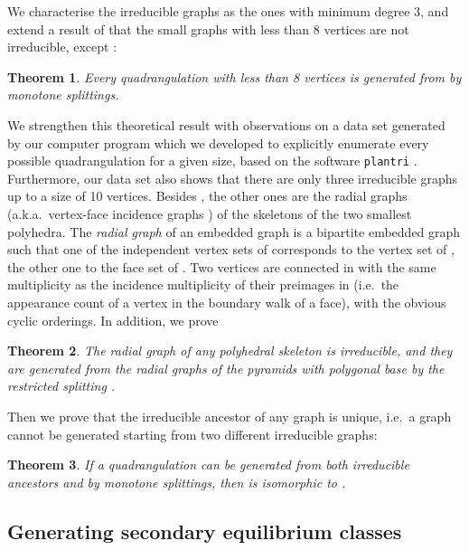 \documentclass[]{article}
\newtheorem{theo}{Theorem}\newtheorem{prop}{Proposition}\newtheorem*{prop*}{Proposition}\newtheorem{coro}{Corollary}\newtheorem{lemm}{Lemma}\theoremstyle{definition}
\newcommand{\plantri}{{\tt plantri}\xspace}
\begin{document}
We characterise the irreducible graphs as the ones with minimum degree 3, and extend a result of \citet{Batagelj1989} that the small graphs with less than 8 vertices are not irreducible, except :

\begin{theo}
  \label{theo:gomboc}
  Every quadrangulation with less than 8 vertices is generated from  by monotone splittings.
\end{theo}

We strengthen this theoretical result with observations on a data set generated by our computer program which we developed to explicitly enumerate every possible quadrangulation for a given size, based on the software \plantri{} \cite{Brinkmann2007}.
Furthermore, our data set also shows that there are only three irreducible graphs up to a size of 10 vertices.
Besides , the other ones are the radial graphs (a.k.a.\  vertex-face incidence graphs \cite{Mohar2001}) of the skeletons of the two smallest polyhedra.
The \emph{radial graph}  of an embedded graph  is a bipartite embedded graph such that one of the independent vertex sets of  corresponds to the vertex set of , the other one to the face set of .
Two vertices are connected in  with the same multiplicity as the incidence multiplicity of their preimages in  (i.e.\  the appearance count of a vertex in the boundary walk of a face), with the obvious cyclic orderings.
In addition, we prove

\begin{theo}
\label{theo:minpol}
The radial graph of any polyhedral skeleton is irreducible, and they are generated from the radial graphs of the pyramids with polygonal base by the restricted splitting .
\end{theo}

Then we prove that the irreducible ancestor of any graph is unique, i.e.\  a graph cannot be generated starting from two different irreducible graphs:

\begin{theo}
  \label{theo:ancestor}
  If a quadrangulation can be generated from both irreducible ancestors  and  by monotone splittings, then  is isomorphic to .
\end{theo}


\subsection{Generating secondary equilibrium classes}
\end{document}
